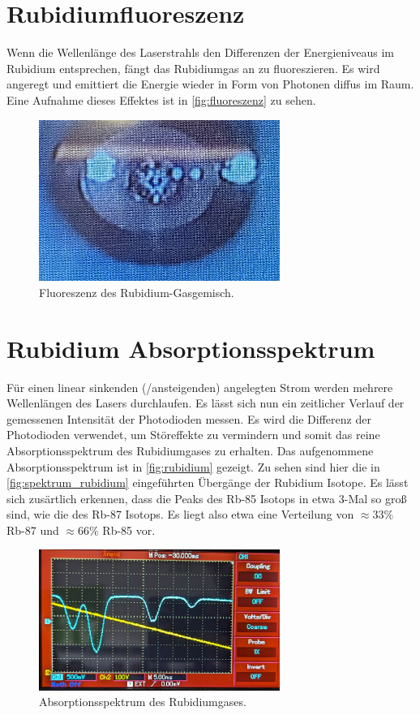 \section{Rubidiumfluoreszenz}

Wenn die Wellenlänge des Laserstrahls den Differenzen der Energieniveaus im Rubidium entsprechen, fängt das Rubidiumgas an zu fluoreszieren. Es wird angeregt und emittiert die Energie wieder
in Form von Photonen diffus im Raum. Eine Aufnahme dieses Effektes ist in \autoref{fig:fluoreszenz} zu sehen.\\

\begin{figure}
    \centering
    \includegraphics[width = 0.7\textwidth]{bilder/fluoreszenz.jpg}
    \caption{Fluoreszenz des Rubidium-Gasgemisch.}
    \label{fig:fluoreszenz}
\end{figure}

\section{Rubidium Absorptionsspektrum}

Für einen linear sinkenden (/ansteigenden) angelegten Strom werden mehrere Wellenlängen des Lasers durchlaufen. Es lässt sich nun ein zeitlicher Verlauf der gemessenen Intensität der Photodioden
messen. Es wird die Differenz der Photodioden verwendet, um Störeffekte zu vermindern und somit das reine Absorptionsspektrum des Rubidiumgases zu erhalten. Das aufgenommene Absorptionsspektrum ist in
\autoref{fig:rubidium} gezeigt. Zu sehen sind hier die in \autoref{fig:spektrum_rubidium} eingeführten Übergänge der Rubidium Isotope. Es lässt sich zusärtlich erkennen, dass die Peaks des Rb-85
Isotops in etwa $3$-Mal so groß sind, wie die des Rb-87 Isotops. Es liegt also etwa eine Verteilung von $\approx 33 \%$ Rb-87 und $\approx 66 \%$ Rb-85 vor.

\begin{figure}
    \centering
    \includegraphics[width = 0.7\textwidth]{bilder/rubudium_abso.jpg}
    \caption{Absorptionsspektrum des Rubidiumgases.}
    \label{fig:rubidium}
\end{figure}